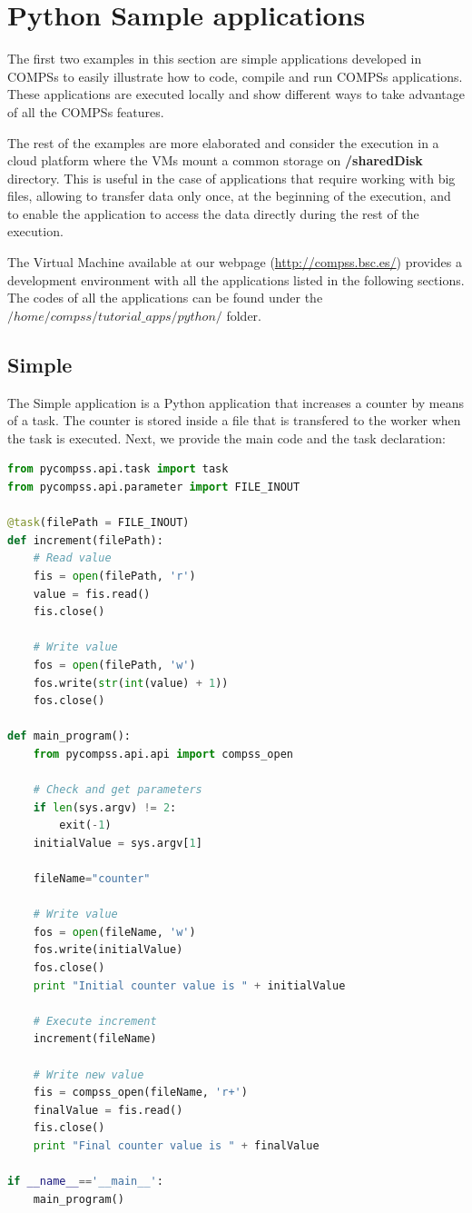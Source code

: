 \section{Python Sample applications}
\label{sec:PythonSampleApps}

The first two examples in this section are simple applications developed in COMPSs to easily illustrate how to code,
compile and run COMPSs applications. These applications are executed locally and show different ways to take advantage
of all the COMPSs features. 

The rest of the examples are more elaborated and consider the execution in a cloud platform where the VMs mount a common 
storage on \textbf{/sharedDisk} directory. This is useful in the case of applications that require working 
with big files, allowing to transfer data only once, at the beginning of the execution, and to enable 
the application to access the data directly during the rest of the execution.

The Virtual Machine available at our webpage (\url{http://compss.bsc.es/}) provides a development environment with
all the applications listed in the following sections. The codes of all the applications can be found under the 
$/home/compss/tutorial\_apps/python/$ folder. 

\subsection{Simple}
The Simple application is a Python application that increases a counter by means of a task. The counter is stored inside a file that 
is transfered to the worker when the task is executed. Next, we provide the main code and the task declaration:

\begin{lstlisting}[language=python]
from pycompss.api.task import task
from pycompss.api.parameter import FILE_INOUT

@task(filePath = FILE_INOUT)
def increment(filePath):
    # Read value
    fis = open(filePath, 'r')
    value = fis.read()
    fis.close()

    # Write value
    fos = open(filePath, 'w')
    fos.write(str(int(value) + 1))
    fos.close()

def main_program():
    from pycompss.api.api import compss_open

    # Check and get parameters
    if len(sys.argv) != 2:
        exit(-1)
    initialValue = sys.argv[1]
    
    fileName="counter"

    # Write value
    fos = open(fileName, 'w')
    fos.write(initialValue)
    fos.close()
    print "Initial counter value is " + initialValue

    # Execute increment
    increment(fileName)

    # Write new value
    fis = compss_open(fileName, 'r+')
    finalValue = fis.read()
    fis.close()
    print "Final counter value is " + finalValue
    
if __name__=='__main__':
    main_program()
\end{lstlisting}

